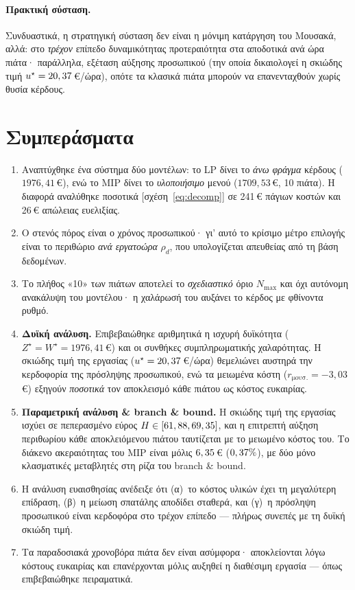 \documentclass[11pt,a4paper]{article}
\newcommand{\en}[1]{\textenglish{#1}}
\begin{document}
\paragraph{Πρακτική σύσταση.} Συνδυαστικά, η στρατηγική σύσταση δεν είναι η μόνιμη
κατάργηση του Μουσακά, αλλά: στο \emph{τρέχον} επίπεδο δυναμικότητας προτεραιότητα
στα αποδοτικά ανά ώρα πιάτα· παράλληλα, εξέταση αύξησης προσωπικού (την οποία
δικαιολογεί η σκιώδης τιμή $u^\star=20,37$\,€/ώρα), οπότε τα κλασικά πιάτα
μπορούν να επανενταχθούν χωρίς θυσία κέρδους.

\section{Συμπεράσματα}\label{sec:conclusions}
\begin{enumerate}
  \item Αναπτύχθηκε ένα σύστημα δύο μοντέλων: το \en{LP} δίνει το \emph{άνω φράγμα}
  κέρδους ($1976{,}41$\,€), ενώ το \en{MIP} δίνει το \emph{υλοποιήσιμο} μενού
  ($1709{,}53$\,€, 10 πιάτα). Η διαφορά αναλύθηκε ποσοτικά [σχέση~\eqref{eq:decomp}]
  σε 241\,€ πάγιων κοστών και 26\,€ απώλειας ευελιξίας.
  \item Ο στενός πόρος είναι ο χρόνος προσωπικού· γι' αυτό το κρίσιμο μέτρο επιλογής
  είναι το περιθώριο \emph{ανά εργατοώρα} $\rho_d$, που υπολογίζεται απευθείας από τη
  βάση δεδομένων.
  \item Το πλήθος «10» των πιάτων αποτελεί το \emph{σχεδιαστικό} όριο $N_{\max}$ και
  όχι αυτόνομη ανακάλυψη του μοντέλου· η χαλάρωσή του αυξάνει το κέρδος με φθίνοντα
  ρυθμό.
  \item \textbf{Δυϊκή ανάλυση.} Επιβεβαιώθηκε αριθμητικά η ισχυρή
  δυϊκότητα ($Z^\star=W^\star=1976{,}41$\,€) και οι συνθήκες συμπληρωματικής
  χαλαρότητας. Η σκιώδης τιμή της εργασίας ($u^\star=20,37$\,€/ώρα)
  θεμελιώνει αυστηρά την κερδοφορία της πρόσληψης προσωπικού, ενώ τα μειωμένα κόστη
  ($r_{\text{μουσ.}}=-3{,}03$\,€) εξηγούν \emph{ποσοτικά} τον αποκλεισμό κάθε πιάτου
  ως κόστος ευκαιρίας.
  \item \textbf{Παραμετρική ανάλυση \& \en{branch \& bound}.} Η σκιώδης τιμή της
  εργασίας ισχύει σε πεπερασμένο εύρος $H\in[61,88,69,35]$, και η επιτρεπτή αύξηση
  περιθωρίου κάθε αποκλειόμενου πιάτου ταυτίζεται με το μειωμένο κόστος του. Το
  διάκενο ακεραιότητας του \en{MIP} είναι μόλις $6,35$\,€ ($0,37\%$), με
  δύο μόνο κλασματικές μεταβλητές στη ρίζα του \en{branch \& bound}.
  \item Η ανάλυση ευαισθησίας ανέδειξε ότι (α)~το κόστος υλικών έχει τη μεγαλύτερη
  επίδραση, (β)~η μείωση σπατάλης αποδίδει σταθερά, και (γ)~η πρόσληψη προσωπικού
  είναι κερδοφόρα στο τρέχον επίπεδο — πλήρως συνεπές με τη δυϊκή σκιώδη τιμή.
  \item Τα παραδοσιακά χρονοβόρα πιάτα δεν είναι ασύμφορα· αποκλείονται λόγω κόστους
  ευκαιρίας και επανέρχονται μόλις αυξηθεί η διαθέσιμη εργασία — όπως επιβεβαιώθηκε
  πειραματικά.
\end{enumerate}
\end{document}
